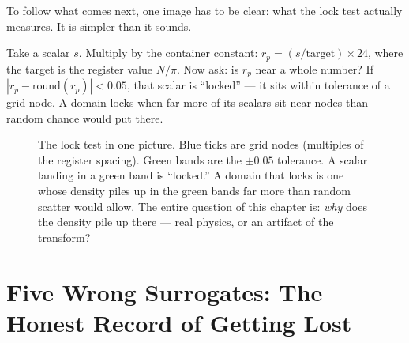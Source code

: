 \documentclass[11pt, letterpaper, openany]{book}
\begin{document}
To follow what comes next, one image has to be clear: what the lock test actually
measures. It is simpler than it sounds.

Take a scalar $s$. Multiply by the container constant: $r_p = (s / \text{target})
\times 24$, where the target is the register value $N/\pi$. Now ask: is $r_p$ near a
whole number? If $|r_p - \text{round}(r_p)| < 0.05$, that scalar is ``locked'' ---
it sits within tolerance of a grid node. A domain locks when far more of its scalars
sit near nodes than random chance would put there.

\begin{figure}[H]
\centering
{}
\caption{The lock test in one picture. Blue ticks are grid nodes (multiples of the
register spacing). Green bands are the $\pm 0.05$ tolerance. A scalar landing in a
green band is ``locked.'' A domain that locks is one whose density piles up in the
green bands far more than random scatter would allow. The entire question of this
chapter is: \emph{why} does the density pile up there --- real physics, or an
artifact of the transform?}
\label{fig:lock_test}
\end{figure}

\section{Five Wrong Surrogates: The Honest Record of Getting Lost}
\end{document}
